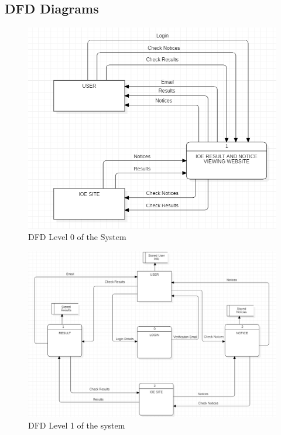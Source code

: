 \subsection*{DFD Diagrams}
\begin{figure}[h]
    \includegraphics[scale=0.5]{images/dfd0.png}
    \caption{DFD Level 0 of the System}
    \label{fig:my_label}
\end{figure}
\newpage
\begin{figure}[tbh]
    \centering
    \includegraphics[scale=0.35]{images/DFD LEVEL1.png}
    \caption{DFD Level 1 of the system}
    \label{fig:my_label}
\end{figure}

